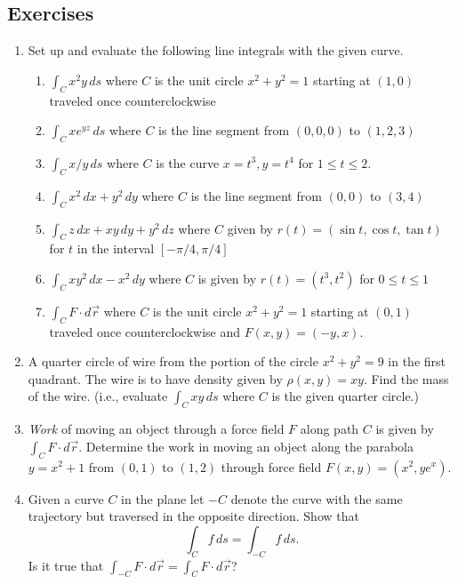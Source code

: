 \documentclass[12pt]{article}
\numberwithin{equation}{subsection}
\numberwithin{figure}{subsection}
\theoremstyle{note}
\begin{document}
{\subsection{Exercises}
\begin{enumerate}[label=\arabic*.]
\item Set up and evaluate the following line integrals with the given curve.

\begin{enumerate}
	\item $\displaystyle \int_C x^2y\,ds$ where $C$ is the unit circle $x^2+y^2=1$ starting at $(1,0)$ traveled once counterclockwise
	\item $\displaystyle \int_C xe^{yz} \,ds$ where $C$ is the line segment from $(0,0,0)$ to $(1,2,3)$
	\item $\displaystyle \int_C x/y \,ds$  where $C$ is the curve $x=t^3, y=t^4$ for $1\leq t\leq 2$.
	\item $\displaystyle \int_C x^2 \,dx + y^2\,dy$ where $C$ is the line segment from $(0,0)$ to $(3,4)$
	\item $\displaystyle \int_C z \,dx+ xy\,dy + y^2 \,dz$ where $C$ given by $r(t)=(\sin t, \cos t, \tan t)$ for $t$ in the interval $[-\pi/4 ,\pi/4]$
	\item $\displaystyle \int_C xy^2 \,dx  -x^2 \,dy$ where $C$ is given by $r(t)=(t^3,t^2)$ for $0\leq t\leq 1$
	\item $\displaystyle \int_C F\cdot d\vec{r}$ where $C$ is the unit circle $x^2+y^2=1$ starting at $(0,1)$ traveled once counterclockwise and $F(x,y)=(-y,x)$.
\end{enumerate}

\item A quarter circle of wire from the portion of the circle $x^2+y^2=9$ in the first quadrant. The wire is to have density given by $\rho(x,y)=xy$. Find the mass of the wire. (i.e., evaluate $\int_C xy\,ds$ where $C$ is the given quarter circle.)

\item \textit{Work} of moving an object through a force field $F$ along path $C$ is given by $\int_C F \cdot d\vec{r}$. Determine the work in moving an object along the parabola $y=x^2+1$ from $(0,1)$ to $(1,2)$ through force field $F(x,y)=(x^2,ye^x)$.

\item Given a curve $C$ in the plane let $-C$ denote the curve with the same trajectory but traversed in the opposite direction. Show that \[\int_C f\,ds= \int_{-C} f\,ds.\] Is it true that  $ \displaystyle \int_{-C} F\cdot  d\vec{r}=\int_C F\cdot d\vec{r}$?
\end{enumerate}


}
\end{document}
